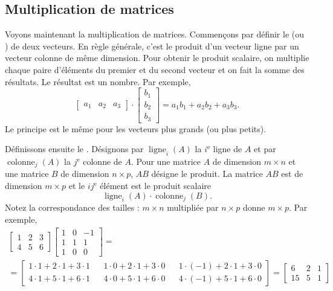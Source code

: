 \subsection{Multiplication de matrices}

Voyons maintenant la multiplication de matrices. Commençons par définir le
\emph{} (ou \emph{}) de deux vecteurs. En règle générale, c'est le produit d'un vecteur ligne par un vecteur colonne de même dimension. Pour obtenir le produit scalaire, on multiplie chaque paire d’éléments du premier et du second vecteur et on fait la somme des résultats. Le résultat est un nombre. Par exemple,
\begin{equation*}
\begin{bmatrix}
a_1 & a_2 & a_3
\end{bmatrix}
\cdot
\begin{bmatrix}
b_1 \\
b_2 \\
b_3
\end{bmatrix}
= a_1 b_1 + a_2 b_2 + a_3 b_3 .
\end{equation*}
Le principe est le même pour les vecteurs plus grands (ou plus petits).

Définissons ensuite le \emph{}. Désignons par $\operatorname{ligne}_i(A)$ la $i^{\text{e}}$ ligne
de $A$ et par
$\operatorname{colonne}_j(A)$ la $j^{\text{e}}$ colonne de $A$.
Pour une matrice $A$ de dimension $m \times n$ et une matrice $B$ de dimension $n \times p$,
$AB$ désigne le produit. La matrice $AB$ est de dimension $m \times p$
et le $ij^{\text{e}}$ élément est le produit scalaire
\begin{equation*}
\operatorname{ligne}_i(A) \cdot
\operatorname{colonne}_j(B) .
\end{equation*}
Notez la correspondance des tailles : $m \times n$ multipliée par $n \times p$ donne 
$m \times p$.  Par exemple,
\begin{multline*}
\begin{bmatrix}
1 & 2 & 3 \\
4 & 5 & 6
\end{bmatrix}
\begin{bmatrix}
1 & 0 & -1 \\
1 & 1 & 1 \\
1 & 0 & 0
\end{bmatrix}
= \\ =
\begin{bmatrix}
1\cdot 1 + 2\cdot 1 + 3 \cdot 1 &  &
1\cdot 0 + 2\cdot 1 + 3 \cdot 0 &  &
1\cdot (-1) + 2\cdot 1 + 3 \cdot 0 \\
4\cdot 1 + 5\cdot 1 + 6 \cdot 1 &  &
4\cdot 0 + 5\cdot 1 + 6 \cdot 0 &  &
4\cdot (-1) + 5\cdot 1 + 6 \cdot 0
\end{bmatrix}
=
\begin{bmatrix}
6 & 2 & 1 \\
15 & 5 & 1
\end{bmatrix}
\end{multline*}

